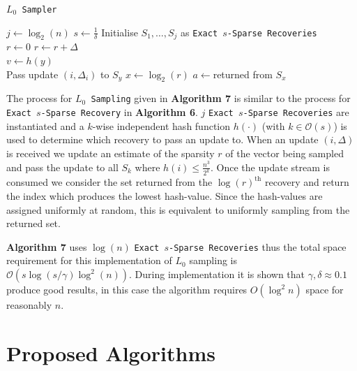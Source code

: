 \documentclass[11pt,twoside,a4paper]{report}
\begin{document}
\begin{algorithm}
	\caption{\texttt{$L_0$ Sampler}}
	$j\leftarrow\log_2(n)$
	$s\leftarrow\frac1\delta$
	Initialise $S_1,\dots,S_j$ as \texttt{Exact $s$-Sparse Recoveries}\\
	$r\leftarrow0$
	 {
		$r\leftarrow r+\Delta$\\
		 {
			$v\leftarrow h(y)$\\
			 {Pass update $(i,\Delta_i)$ to $S_y$}
		}
	}
	$x\leftarrow\log_2(r)$
	$a\leftarrow$returned from $S_x$
\end{algorithm}

The process for \texttt{$L_0$ Sampling} given in \textbf{Algorithm 7} is similar to the process for \texttt{Exact $s$-Sparse Recovery} in \textbf{Algorithm 6}. $j$ \texttt{Exact $s$-Sparse Recoveries} are instantiated and a $k$-wise independent hash function $h(\cdot)$ (with $k\in\mathcal{O}(s)$) is used to determine which recovery to pass an update to. When an update $(i,\Delta)$ is received we update an estimate of the sparsity $r$ of the vector being sampled and pass the update to all $S_k$ where $h(i)\leq\frac{n^3}{2^k}$. Once the update stream is consumed we consider the set returned from the $\log(r)^\text{th}$ recovery and return the index which produces the lowest hash-value. Since the hash-values are assigned uniformly at random, this is equivalent to uniformly sampling from the returned set.

\par \textbf{Algorithm 7} uses $\log(n)$ \texttt{Exact $s$-Sparse Recoveries} thus the total space requirement for this implementation of $L_0$ sampling is $\mathcal{O}(s\log(s/\gamma)\log^2(n))$. During implementation it is shown that $\gamma,\delta\approx0.1$ produce good results, in this case the algorithm requires $O(\log^2 n)$ space for reasonably $n$.

\section{Proposed Algorithms}
\end{document}
